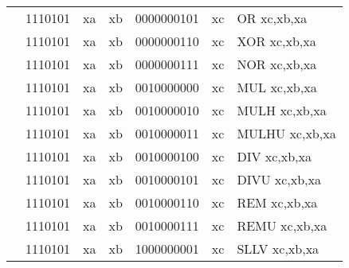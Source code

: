 \begin{table}[p]
\begin{small}
\begin{center}
\begin{tabular}{rcccccccccl}
&
\multicolumn{2}{|c|}{1110101} &
\multicolumn{1}{c|}{xa} &
\multicolumn{1}{c|}{xb} &
\multicolumn{4}{c|}{0000000101} &
\multicolumn{1}{c|}{xc} & OR xc,xb,xa \\
\cline{2-10}
  

&
\multicolumn{2}{|c|}{1110101} &
\multicolumn{1}{c|}{xa} &
\multicolumn{1}{c|}{xb} &
\multicolumn{4}{c|}{0000000110} &
\multicolumn{1}{c|}{xc} & XOR xc,xb,xa \\
\cline{2-10}
  

&
\multicolumn{2}{|c|}{1110101} &
\multicolumn{1}{c|}{xa} &
\multicolumn{1}{c|}{xb} &
\multicolumn{4}{c|}{0000000111} &
\multicolumn{1}{c|}{xc} & NOR xc,xb,xa \\
\cline{2-10}
  

&
\multicolumn{2}{|c|}{1110101} &
\multicolumn{1}{c|}{xa} &
\multicolumn{1}{c|}{xb} &
\multicolumn{4}{c|}{0010000000} &
\multicolumn{1}{c|}{xc} & MUL xc,xb,xa \\
\cline{2-10}
  

&
\multicolumn{2}{|c|}{1110101} &
\multicolumn{1}{c|}{xa} &
\multicolumn{1}{c|}{xb} &
\multicolumn{4}{c|}{0010000010} &
\multicolumn{1}{c|}{xc} & MULH xc,xb,xa \\
\cline{2-10}
  

&
\multicolumn{2}{|c|}{1110101} &
\multicolumn{1}{c|}{xa} &
\multicolumn{1}{c|}{xb} &
\multicolumn{4}{c|}{0010000011} &
\multicolumn{1}{c|}{xc} & MULHU xc,xb,xa \\
\cline{2-10}
  

&
\multicolumn{2}{|c|}{1110101} &
\multicolumn{1}{c|}{xa} &
\multicolumn{1}{c|}{xb} &
\multicolumn{4}{c|}{0010000100} &
\multicolumn{1}{c|}{xc} & DIV xc,xb,xa \\
\cline{2-10}
  

&
\multicolumn{2}{|c|}{1110101} &
\multicolumn{1}{c|}{xa} &
\multicolumn{1}{c|}{xb} &
\multicolumn{4}{c|}{0010000101} &
\multicolumn{1}{c|}{xc} & DIVU xc,xb,xa \\
\cline{2-10}
  

&
\multicolumn{2}{|c|}{1110101} &
\multicolumn{1}{c|}{xa} &
\multicolumn{1}{c|}{xb} &
\multicolumn{4}{c|}{0010000110} &
\multicolumn{1}{c|}{xc} & REM xc,xb,xa \\
\cline{2-10}
  

&
\multicolumn{2}{|c|}{1110101} &
\multicolumn{1}{c|}{xa} &
\multicolumn{1}{c|}{xb} &
\multicolumn{4}{c|}{0010000111} &
\multicolumn{1}{c|}{xc} & REMU xc,xb,xa \\
\cline{2-10}
  

&
\multicolumn{2}{|c|}{1110101} &
\multicolumn{1}{c|}{xa} &
\multicolumn{1}{c|}{xb} &
\multicolumn{4}{c|}{1000000001} &
\multicolumn{1}{c|}{xc} & SLLV xc,xb,xa \\
\cline{2-10}
  


\end{tabular}
\end{center}
\end{small}
\end{table}

